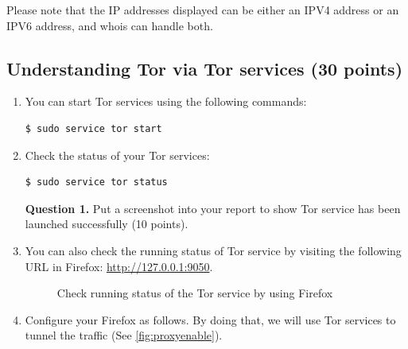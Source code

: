 \documentclass[11pt]{article}
\newcommand{\tor}{{\sf Tor}\xspace}
\begin{document}
\begin{enumerate}
\begin{enumerate}
Please note that the IP addresses displayed can be either an IPV4 address or an IPV6 address, and \textsf{whois} can handle both.  

\end{enumerate}

\subsection{Understanding \tor via \tor services (30 points)} 
\begin{enumerate}

\item You can start \tor services using the following commands: 
 \begin{lstlisting}
$ sudo service tor start
\end{lstlisting}\vspace{-6mm}


\item Check the status of your \tor services:
 \begin{lstlisting}
$ sudo service tor status
\end{lstlisting}\vspace{-6mm}

\textbf{Question 1.} Put a screenshot into your report to show \tor service has been launched successfully (10 points). 


\item You can also check the running status of \tor service by visiting the following URL in \textsf{Firefox}: \url{http://127.0.0.1:9050}.

\begin{figure}[h]
\centering
{}
\caption{Check running status of the \tor service by using {\sf Firefox}}\label{fig:proxy}
\end{figure}

\item Configure your \textsf{Firefox} as follows. By doing that, we will use \tor services to tunnel the traffic (See \autoref{fig:proxyenable}). 


\end{enumerate}
\end{enumerate}
\end{document}

